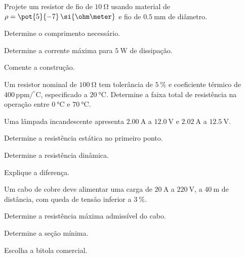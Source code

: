 \blocoaprofundamento
\begin{questao}[3]{}

Projete um resistor de fio de $\SI{10}{\ohm}$ usando material de
$\rho=\pot{5}{-7}\,\si{\ohm\meter}$ e fio de $\SI{0.5}{\milli\meter}$ de
diâmetro.
\begin{itensq}
\item Determine o comprimento necessário.
\item Determine a corrente máxima para $\SI{5}{\watt}$ de dissipação.
\item Comente a construção.
\end{itensq}


\end{questao}
\begin{questao}[3]{}

Um resistor nominal de $\SI{100}{\ohm}$ tem tolerância de $\SI{5}{\percent}$ e
coeficiente térmico de $400\,\mathrm{ppm/^{\circ}C}$, especificado a
$\SI{20}{\celsius}$. Determine a faixa total de resistência na operação entre
$\SI{0}{\celsius}$ e $\SI{70}{\celsius}$.


\end{questao}
\begin{questao}[3]{}

Uma lâmpada incandescente apresenta $\SI{2.00}{\ampere}$ a
$\SI{12.0}{\volt}$ e $\SI{2.02}{\ampere}$ a $\SI{12.5}{\volt}$.
\begin{itensq}
\item Determine a resistência estática no primeiro ponto.
\item Determine a resistência dinâmica.
\item Explique a diferença.
\end{itensq}


\end{questao}
\begin{questao}[3]{}

Um cabo de cobre deve alimentar uma carga de $\SI{20}{\ampere}$ a
$\SI{220}{\volt}$, a $\SI{40}{\meter}$ de distância, com queda de tensão
inferior a $\SI{3}{\percent}$.
\begin{itensq}
\item Determine a resistência máxima admissível do cabo.
\item Determine a seção mínima.
\item Escolha a bitola comercial.
\end{itensq}


\end{questao}
